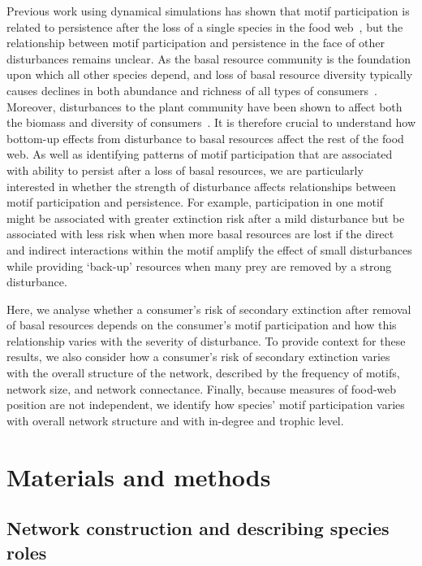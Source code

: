 \documentclass[12pt]{article}
\begin{document}
\begin{spacing}{1.0}
    Previous work using dynamical simulations has shown that motif participation is related to persistence after the loss of a single species in the food web~\citep{Cirtwill2022Oikos}, but the relationship between motif participation and persistence in the face of other disturbances remains unclear.
   As the basal resource community is the foundation upon which all other species depend, and loss of basal resource diversity typically causes declines in both abundance and richness of all types of consumers~\citep{scherber2010bottom,Dobson2009food,Georgiadis2007}.
    Moreover, disturbances to the plant community have been shown to affect both the biomass and diversity of consumers~\citep{chen2019plant,scherber2010bottom,li2020bottom}.
    It is therefore crucial to understand how bottom-up effects from disturbance to basal resources affect the rest of the food web.  
    As well as identifying patterns of motif participation that are associated with ability to persist after a loss of basal resources, we are particularly interested in whether the strength of  disturbance affects relationships between motif participation and persistence.
    For example, participation in one motif might be associated with greater extinction risk after a mild disturbance but be associated with less risk when when more basal resources are lost if the direct and indirect interactions within the motif amplify the effect of small disturbances while providing `back-up' resources when many prey are removed by a strong disturbance.

        
    Here, we analyse whether a consumer's risk of secondary extinction after removal of basal resources depends on the consumer's motif participation and how this relationship varies with the severity of disturbance.
    To provide context for these results, we also consider how a consumer's risk of secondary extinction varies with the overall structure of the network, described by the frequency of motifs, network size, and network connectance.
    Finally, because measures of food-web position are not independent, we identify how species' motif participation varies with overall network structure and with in-degree and trophic level.


\section*{Materials and methods}

    \subsection*{Network construction and describing species roles}


\end{spacing}
\end{document}
